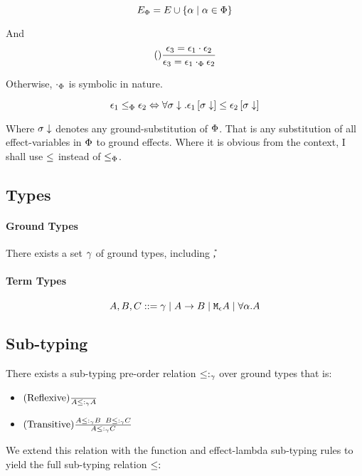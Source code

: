 {\begin{equation}
    E_\P = E \cup \left\{\a \mid \a \in \P \right\}
\end{equation}

And 
\begin{equation}
    \treerule{}{\e_3 = \e_1\dot\e_2}{\e_3 = \e_1\dotp\e_2}
\end{equation}

Otherwise, $\dotp$ is symbolic in nature.

\begin{equation}
    \e_1 \subeffect_\P \e_2 \Leftrightarrow \forall \si\downarrow. \e_1\sub{\si\downarrow} \subeffect \e_2\sub{\si\downarrow}
\end{equation}

Where $\si\downarrow$ denotes any ground-substitution of $\P$. That is any substitution of all effect-variables in $\P$ to ground effects. Where it is obvious from the context, I shall use $\subeffect$ instead of $\subeffect_\P$.


\subsection{Types}
    \paragraph{Ground Types}
        There exists a set $\ground$ of ground types, including \U, \B
    \paragraph{Term Types}
    $$ A, B, C \gens \ground \mid \ab \mid \mea \mid \all{\a}{A}$$
  

\subsection{Sub-typing}
    There exists a sub-typing pre-order relation $\subtype_{\ground}$ over ground types that is:
    \begin{itemize}
        \item $\treerule{Reflexive}{}{A \subtype_{\ground} A}$
        \item $\treerule{Transitive}{A \subtype_{\ground} B \s \s B \subtype_{\ground} C}{A \subtype_{\ground} C}$
    \end{itemize}

    We extend this relation with the function and effect-lambda sub-typing rules to yield the full sub-typing relation $\subtype$

}

